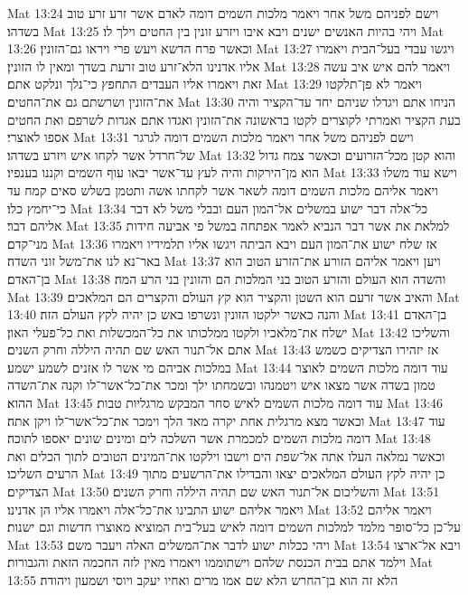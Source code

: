 Mat 13:24  וישם לפניהם משל אחר ויאמר מלכות השמים דומה לאדם אשר זרע זרע טוב בשדהו׃
Mat 13:25  ויהי בהיות האנשים ישנים ויבא איבו ויזרע זונין בין החטים וילך לו׃
Mat 13:26  וכאשר פרח הדשא ויעש פרי ויראו גם־הזונין׃
Mat 13:27  ויגשו עבדי בעל־הבית ויאמרו אליו אדנינו הלא־זרע טוב זרעת בשדך ומאין לו הזונין׃
Mat 13:28  ויאמר להם איש איב עשה זאת ויאמרו אליו העבדים התחפץ כי־נלך ונלקט אתם׃
Mat 13:29  ויאמר לא פן־תלקטו את־הזונין ושרשתם גם את־החטים׃
Mat 13:30  הניחו אתם ויגדלו שניהם יחד עד־הקציר והיה בעת הקציר ואמרתי לקוצרים לקטו בראשונה את־הזונין ואגדו אתם אגדות לשרפם ואת החטים אספו לאוצרי׃
Mat 13:31  וישם לפניהם משל אחר ויאמר מלכות השמים דומה לגרגר של־חרדל אשר לקחו איש ויזרע בשדהו׃
Mat 13:32  והוא קטן מכל־הזרועים וכאשר צמח גדול הוא מן־הירקות והיה לעץ עד־אשר יבאו עוף השמים וקננו בענפיו׃
Mat 13:33  וישא עוד משלו ויאמר אליהם מלכות השמים דומה לשאר אשר לקחתו אשה ותטמן בשלש סאים קמח עד כי־יחמץ כלו׃
Mat 13:34  כל־אלה דבר ישוע במשלים אל־המון העם ובבלי משל לא דבר אליהם דבר׃
Mat 13:35  למלאת את אשר דבר הנביא לאמר אפתחה במשל פי אביעה חידות מני־קדם׃
Mat 13:36  אז שלח ישוע את־המון העם ויבא הביתה ויגשו אליו תלמידיו ויאמרו באר־נא לנו את־משל זוני השדה׃
Mat 13:37  ויען ויאמר אליהם הזורע את־הזרע הטוב הוא בן־האדם׃
Mat 13:38  והשדה הוא העולם והזרע הטוב בני המלכות הם והזונין בני הרע המה׃
Mat 13:39  והאיב אשר זרעם הוא השטן והקציר הוא קץ העולם והקצרים הם המלאכים׃
Mat 13:40  והנה כאשר ילקטו הזונין ונשרפו באש כן יהיה לקץ העולם הזה׃
Mat 13:41  בן־האדם ישלח את־מלאכיו ולקטו ממלכותו את כל־המכשלות ואת כל־פעלי האון׃
Mat 13:42  והשליכו אתם אל־תנור האש שם תהיה היללה וחרק השנים׃
Mat 13:43  אז יזהירו הצדיקים כשמש במלכות אביהם מי אשר לו אזנים לשמע ישמע׃
Mat 13:44  עוד דומה מלכות השמים לאוצר טמון בשדה אשר מצאו איש ויטמנהו ובשמחתו ילך ומכר את־כל־אשר־לו וקנה את־השדה ההוא׃
Mat 13:45  עוד דומה מלכות השמים לאיש סחר המבקש מרגליות טבות׃
Mat 13:46  וכאשר מצא מרגלית אחת יקרה מאד הלך וימכר את־כל־אשר־לו ויקן אתה׃
Mat 13:47  עוד דומה מלכות השמים למכמרת אשר השלכה לים ומינים שונים יאספו לתוכה׃
Mat 13:48  וכאשר נמלאה העלו אתה אל־שפת הים וישבו וילקטו את־המינים הטובים לתוך הכלים ואת הרעים השליכו׃
Mat 13:49  כן יהיה לקץ העולם המלאכים יצאו והבדילו את־הרשעים מתוך הצדיקים׃
Mat 13:50  והשליכום אל־תנור האש שם תהיה היללה וחרק השנים׃
Mat 13:51  ויאמר אליהם ישוע התבינו את־כל־אלה ויאמרו אליו הן אדנינו׃
Mat 13:52  ויאמר אליהם על־כן כל־סופר מלמד למלכות השמים דומה לאיש בעל־בית המוציא מאוצרו חדשות וגם ישנות׃
Mat 13:53  ויהי ככלות ישוע לדבר את־המשלים האלה ויעבר משם׃
Mat 13:54  ויבא אל־ארצו וילמד אתם בבית הכנסת שלהם וישתוממו ויאמרו מאין לזה החכמה הזאת והגבורות׃
Mat 13:55  הלא זה הוא בן־החרש הלא שם אמו מרים ואחיו יעקב ויוסי ושמעון ויהודה׃
